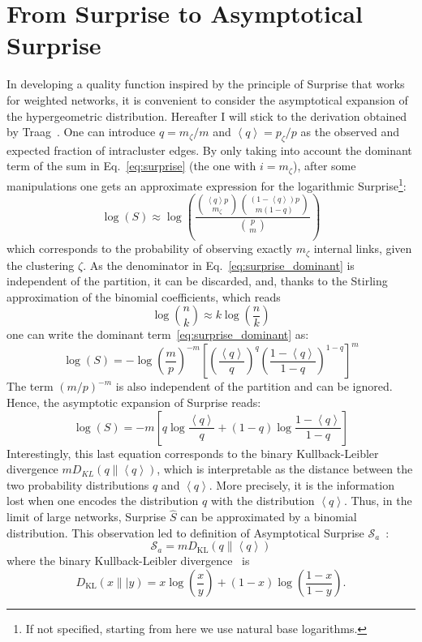 \section{From Surprise to Asymptotical Surprise}
In developing a quality function inspired by the principle of Surprise that works for weighted networks, it is convenient to consider the asymptotical expansion of the hypergeometric distribution.
Hereafter I will stick to the derivation obtained by Traag~\cite{traag2015}.
One can introduce $q=m_\zeta/m$ and $\left<q \right>=p_\zeta/p$ as the observed and expected fraction of intracluster edges.
By only taking into account the dominant term of the sum in Eq.~\ref{eq:surprise} (the one with $i=m_\zeta$), after some manipulations one gets an approximate expression for the logarithmic Surprise\footnote{If not specified, starting from here we use natural base logarithms.}:
\begin{equation}\label{eq:surprise_dominant}
\log(S) \approx \log \left( \frac{\binom{\left<q\right> p}{m_\zeta} \binom{(1-\left<q\right>)p}{m(1-q)}}{\binom{p}{m}} \right)
\end{equation}
which corresponds to the probability of observing exactly $m_\zeta$ internal links, given the clustering $\zeta$.
As the denominator in Eq.~\ref{eq:surprise_dominant} is independent of the partition, it can be discarded, and, thanks to the Stirling approximation of the binomial coefficients, which reads 
\begin{equation}
\log \binom{n}{k} \approx k \log \left( \frac{n}{k} \right)
\end{equation}
one can write the dominant term~\ref{eq:surprise_dominant} as:
\begin{equation}
\log(S) = - \log \left(\frac{m}{p}\right)^{-m} \left[ \left(\frac{\left< q\right>}{q}\right)^q \left(\frac{1-\left< q\right>}{1-q}\right)^{1-q} \right]^{m}
\end{equation}
The term $(m/p)^{-m}$ is also independent of the partition and can be ignored.
Hence, the asymptotic expansion of Surprise reads:
\begin{equation}
\log(S) = -m \left[ q \log \frac{\left<q\right>}{q} + (1-q)\log \frac{1-\left<q\right>}{1-q} \right]
\end{equation}
Interestingly, this last equation corresponds to the binary Kullback-Leibler divergence $m D_{KL}(q \| \left< q \right>)$, which is interpretable as the distance between the two probability distributions $q$ and $\left<q\right>$.
More precisely, it is the information lost when one encodes the distribution $q$ with the distribution $\left< q\right>$.
Thus, in the limit of large networks, Surprise $\hat{S}$ can be approximated by a binomial distribution.
This observation led to definition of Asymptotical Surprise $\mathcal{S}_a$~\cite{traag2015}:
\begin{equation}\label{eq:asymptoticalsurprise}
\mathcal{S}_a = m D_{\textrm{KL}}\left( q \| \left< q \right> \right)
\end{equation}
where the binary Kullback-Leibler divergence~\cite{kullback1951,cover2006} is $$D_{\textrm{KL}}(x\|| y) = x \log \left(\frac{x}{y} \right) + (1-x)\log \left (\frac{1-x}{1-y} \right).$$


